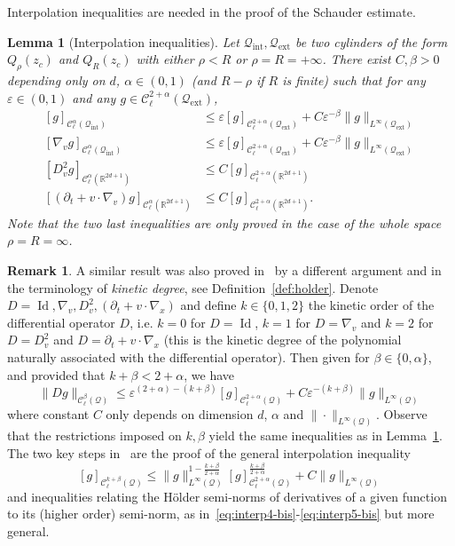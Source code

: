 \documentclass[10pt]{amsart}
\newtheorem{lemm}[theo]{Lemma}\newtheorem{prop}[theo]{Proposition}\newtheorem{coro}[theo]{Corollary}\newtheorem{conj}[theo]{Conjecture}
\theoremstyle{definition}\newtheorem{defi}[theo]{Definition}\newtheorem{rema}[theo]{Remark}\newtheorem{exam}[theo]{Example}\newtheorem{exem}[theo]{Example}\newtheorem{nota}[theo]{Notation}
\newcommand{\R}{\mathbb{R}}
\newcommand{\cC}{\mathcal{C}}
\newcommand{\cQ}{\mathcal{Q}}
\newcommand{\Qext}{\cQ_{\mathrm{ext}}}
\newcommand{\Qint}{\cQ_{\mathrm{int}}}
\DeclareMathOperator{\Id}{Id}
\newcommand*\eps{\varepsilon}
\begin{document}
Interpolation inequalities are needed in the proof of the Schauder estimate.

\begin{lemm}[Interpolation inequalities]\label{l:interpol}
Let $\Qint, \Qext$ be two cylinders of the form $Q_\rho(z_c)$ and $Q_R(z_c)$ with either $\rho < R$ or $\rho = R = +\infty$. There exist $C,\beta>0$ depending only on $d$, $\alpha \in (0,1)$ (and $R-\rho$ if $R$ is finite) such that for any $\eps \in (0,1)$ and any $g \in \cC_\ell^{2+\alpha}(\Qext)$,
\begin{align}\label{eq:interp1}
[g]_{\cC^\alpha_\ell (\Qint)} & \le \eps [g]_{\cC_\ell^{2+\alpha}(\Qext)} + C \eps^{-\beta} \|g\|_{L^\infty(\Qext)} \\\label{eq:interp3}
\left[\nabla_v g\right]_{\cC_\ell^{\alpha}(\Qint)} & \le \eps [g]_{\cC_\ell^{2+\alpha} (\Qext)} + C\eps^{-\beta} \|g\|_{L^\infty (\Qext)}\\\label{eq:interp4-bis}
\left[D^2 _v g\right]_{\cC_\ell^\alpha\left(\R^{2d+1}\right)} & \le C [g]_{\cC_\ell^{2+\alpha}\left(\R^{2d+1}\right)} \\\label{eq:interp5-bis}
\left[\left(\partial_t + v \cdot \nabla_v\right) g\right]_{\cC_\ell^\alpha\left(\R^{2d+1}\right)} & \le C [g]_{\cC_\ell^{2+\alpha}\left(\R^{2d+1}\right)}.
\end{align}
Note that the two last inequalities are only proved in the case of the whole space $\rho=R=\infty$.
\end{lemm}


\begin{rema}
A similar result was also proved in~\cite[Lemma~2.7]{imbert2018schauder} by a different argument and in the terminology of \emph{kinetic degree}, see Definition~\ref{def:holder}. Denote $D=\Id,\nabla_v, D^2_v,(\partial_t + v \cdot \nabla_x)$ and define $k \in \{0,1,2\}$ the kinetic order of the differential operator $D$, i.e. $k=0$ for $D=\Id$, $k=1$ for $D = \nabla_v$ and $k=2$ for $D=D^2_v$ and $D=\partial_t + v \cdot \nabla_x$ (this is the kinetic degree of the polynomial naturally associated with the differential operator). Then given for $\beta \in \{0,\alpha\}$, and provided that $k+\beta < 2+\alpha$, we have
\begin{equation}\label{e:interpol-cyril}
\|Dg\|_{\cC_\ell^\beta(\cQ)} \le \eps^{(2+\alpha)-(k+\beta)} [g]_{\cC_\ell^{2+\alpha}(\cQ)} + C\eps^{-(k+\beta)} \|g\|_{L^\infty(\cQ)}
\end{equation}
where constant $C$ only depends on dimension $d$, $\alpha$ and $\|\cdot\|_{L^\infty(\cQ)}$. Observe that the restrictions imposed on $k,\beta$ yield the same inequalities as in Lemma~\ref{l:interpol}. The two key steps in~\cite[Lemma~2.7]{imbert2018schauder} are the proof of the general interpolation inequality
\[
[g]_{\cC_\ell^{k+\beta}(\cQ)} \le
\|g\|_{L^\infty(\cQ)}^{1-\frac{k+\beta}{2+\alpha}} [g]_{\cC_\ell^{2+\alpha}(\cQ)}^{\frac{k+\beta}{2+\alpha}} + C
\|g\|_{L^\infty(\cQ)}
\]
and inequalities relating the H\"older semi-norms of derivatives of a given function to its (higher order) semi-norm, as in~\eqref{eq:interp4-bis}-\eqref{eq:interp5-bis} but more general.
\end{rema}
\end{document}
